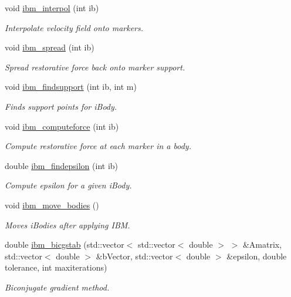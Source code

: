 \begin{DoxyCompactItemize}
void \hyperlink{class_object_manager_aff31915ad0effdcc8dc18f602ddd1c20}{ibm\+\_\+interpol} (int ib)
\begin{DoxyCompactList}\small\item\em Interpolate velocity field onto markers. \end{DoxyCompactList}\item 
void \hyperlink{class_object_manager_a8096f9ec97cf7ce2fc45ebfcbdf3617e}{ibm\+\_\+spread} (int ib)
\begin{DoxyCompactList}\small\item\em Spread restorative force back onto marker support. \end{DoxyCompactList}\item 
void \hyperlink{class_object_manager_a500427b7ac8fc16eac33f804f64abdab}{ibm\+\_\+findsupport} (int ib, int m)
\begin{DoxyCompactList}\small\item\em Finds support points for i\+Body. \end{DoxyCompactList}\item 
void \hyperlink{class_object_manager_a5722d37636b6cd2ab92efdb6fe4bcdfa}{ibm\+\_\+computeforce} (int ib)
\begin{DoxyCompactList}\small\item\em Compute restorative force at each marker in a body. \end{DoxyCompactList}\item 
double \hyperlink{class_object_manager_a2b544fe34e298302f3e5e8b2f981c2d8}{ibm\+\_\+findepsilon} (int ib)
\begin{DoxyCompactList}\small\item\em Compute epsilon for a given i\+Body. \end{DoxyCompactList}\item 
void \hyperlink{class_object_manager_ad874ba69d231d4c1720c4e3a68ff3499}{ibm\+\_\+move\+\_\+bodies} ()
\begin{DoxyCompactList}\small\item\em Moves i\+Bodies after applying I\+BM. \end{DoxyCompactList}\item 
double \hyperlink{class_object_manager_adad4317bfbe5bae833c4ffa3e4538d92}{ibm\+\_\+bicgstab} (std\+::vector$<$ std\+::vector$<$ double $>$ $>$ \&Amatrix, std\+::vector$<$ double $>$ \&b\+Vector, std\+::vector$<$ double $>$ \&epsilon, double tolerance, int maxiterations)
\begin{DoxyCompactList}\small\item\em Biconjugate gradient method. \end{DoxyCompactList}\item 

\end{DoxyCompactItemize}
